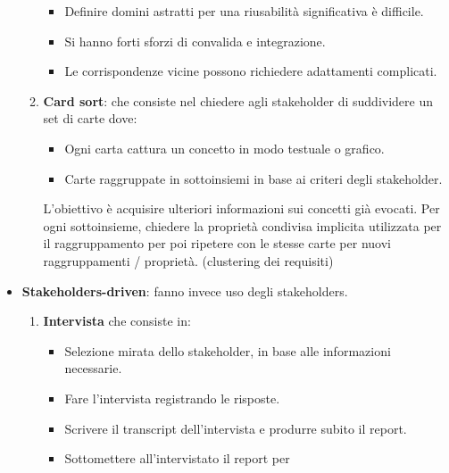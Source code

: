\begin{itemize}
\begin{enumerate}
\begin{itemize}
                              \item Definire domini astratti per una riusabilità
                                    significativa è difficile.
                              \item Si hanno forti sforzi di convalida e integrazione.
                              \item Le corrispondenze vicine possono richiedere
                                    adattamenti complicati.
                        \end{itemize}
                  \item \textbf{Card sort}: che consiste nel chiedere agli
                        stakeholder di suddividere un set di carte dove:
                        \begin{itemize}
                              \item Ogni carta cattura un concetto in modo testuale
                                    o grafico.
                              \item Carte raggruppate in sottoinsiemi in base ai
                                    criteri degli stakeholder.
                        \end{itemize}
                        L'obiettivo è acquisire ulteriori informazioni sui
                        concetti già evocati. Per ogni sottoinsieme, chiedere la
                        proprietà condivisa implicita utilizzata per il
                        raggruppamento per poi ripetere con le stesse carte per
                        nuovi raggruppamenti / proprietà. (clustering dei requisiti)
            \end{enumerate}
      \item \textbf{Stakeholders-driven}: fanno invece uso degli stakeholders.
            \begin{enumerate}
                  \item \textbf{Intervista} che consiste in:
                        \begin{itemize}
                              \item Selezione mirata dello stakeholder, in base
                                    alle informazioni necessarie.
                              \item Fare l'intervista registrando le risposte.
                              \item Scrivere il transcript dell'intervista e
                                    produrre subito il report.
                              \item Sottomettere all'intervistato il report per

\end{itemize}
\end{enumerate}
\end{itemize}
